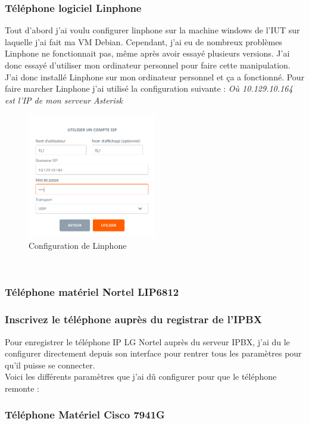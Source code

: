 \documentclass[12pt, a4paper]{article}
\begin{document}
	\subsubsection{Téléphone logiciel Linphone}
	Tout d'abord j'ai voulu configurer linphone sur la machine windows de l'IUT
	sur laquelle j'ai fait ma VM Debian. Cependant, j'ai eu de nombreux problèmes
	Linphone ne fonctionnait pas, même après avoir essayé plusieurs versions. 
	J'ai donc essayé d'utiliser mon ordinateur personnel pour faire cette 
	manipulation. J'ai donc installé Linphone sur mon ordinateur personnel et 
	ça a fonctionné. Pour faire marcher Linphone j'ai utilisé la configuration suivante : \textit{Où 10.129.10.164 est l'IP de mon serveur Asterisk}
	\begin{figure}[h]
		\centering
		\includegraphics[width=0.5\textwidth]{img/linphone.png}
		\caption{Configuration de Linphone}
		\label{fig:lin}
	\end{figure}\\

	\subsubsection{Téléphone matériel Nortel LIP6812}
	\subsubsection*{Inscrivez le téléphone auprès du registrar de l'IPBX}
	Pour enregistrer le téléphone IP LG Nortel auprès du serveur IPBX, j'ai du
	le configurer directement depuis son interface pour rentrer tous les paramètres 
	pour qu'il puisse se connecter. \\
	Voici les différents paramètres que j'ai dû configurer pour que le téléphone remonte :


	\subsubsection{Téléphone Matériel Cisco 7941G}
\end{document}
